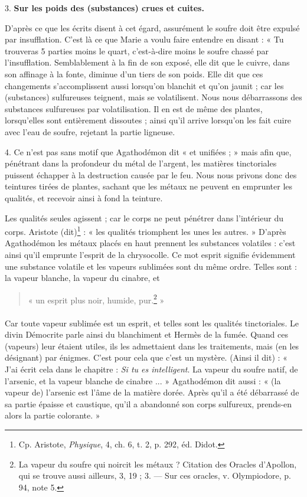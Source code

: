 \documentclass[a4paper, 11pt, oneside, polutonikogreek, french]{article}
\begin{document}
3. \textbf{Sur les poids des (substances) crues et cuites.}

D'après ce que les écrits disent à cet égard, assurément le soufre doit être expulsé par insufflation. C'est là ce que Marie a voulu faire entendre en disant : « Tu trouveras 5 parties moins le quart, c'est-à-dire moins le soufre chassé par l'insufflation. Semblablement à la fin de son exposé, elle dit que le cuivre, dans son affinage à la fonte, diminue d'un tiers de son poids. Elle dit que ces changements s'accomplissent aussi lorsqu'on blanchit et qu'on jaunit ; car les (substances) sulfureuses teignent, mais se volatilisent. Nous nous débarrassons des substances sulfureuses par volatilisation. Il en est de même des plantes, lorsqu'elles sont entièrement dissoutes ; ainsi qu'il arrive lorsqu'on les fait cuire avec l'eau de soufre, rejetant la partie ligneuse.

4. Ce n'est pas sans motif que Agathodémon dit « et unifiées ; » mais afin que, pénétrant dans la profondeur du métal de l'argent, les matières tinctoriales puissent échapper à la destruction causée par le feu. Nous nous privons donc des teintures tirées de plantes, sachant que les métaux ne peuvent en emprunter les qualités, et recevoir ainsi à fond la teinture.

Les qualités seules agissent ; car le corps ne peut pénétrer dans l'intérieur du corps. Aristote (dit)\footnote{Cp. Aristote, \emph{Physique}, 4, ch. 6, t. 2, p. 292, éd. Didot.} : « les qualités triomphent les unes les autres. » D'après Agathodémon les métaux placés en haut prennent les substances volatiles : c'est ainsi qu'il emprunte l'esprit de la chrysocolle. Ce mot esprit signifie évidemment une substance volatile et les vapeurs sublimées sont du même ordre. Telles sont : la vapeur blanche, la vapeur du cinabre, et
\begin{quotation}
« un esprit plus noir, humide, pur.\footnote{La vapeur du soufre qui noircit les métaux ? Citation des Oracles d'Apollon, qui se trouve aussi ailleurs, 3, 19 ; 3. --- Sur ces oracles, v. Olympiodore, p. 94, note 5.} »
\end{quotation}
\paragraph{}
Car toute vapeur sublimée est un esprit, et telles sont les qualités tinctoriales. Le divin Démocrite parle ainsi du blanchiment et Hermès de la fumée. Quand ces (vapeurs) leur étaient utiles, ils les admettaient dans les traitements, mais (en les désignant) par énigmes. C'est pour cela que c'est un mystère. (Ainsi il dit) : « J'ai écrit cela dans le chapitre : \emph{Si tu es intelligent}. La vapeur du soufre natif, de l'arsenic, et la vapeur blanche de cinabre ... » Agathodémon dit aussi : « (la vapeur de) l'arsenic est l'âme de la matière dorée. Après qu'il a été débarrassé de sa partie épaisse et caustique, qu'il a abandonné son corps sulfureux, prends-en alors la partie colorante. »
\end{document}
